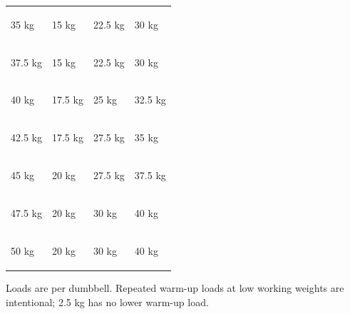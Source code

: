 \documentclass[11pt,a4paper]{article}
\begin{document}
\begin{center}
{\begin{tabular}{|>{\bfseries}C{4.15cm}|C{4.32cm}|C{4.32cm}|C{4.32cm}|}
\rule[-4.2mm]{0pt}{10.65mm}35 kg & 15 kg & 22.5 kg & 30 kg \\
\rule[-4.2mm]{0pt}{10.65mm}37.5 kg & 15 kg & 22.5 kg & 30 kg \\
\rule[-4.2mm]{0pt}{10.65mm}40 kg & 17.5 kg & 25 kg & 32.5 kg \\
\rule[-4.2mm]{0pt}{10.65mm}42.5 kg & 17.5 kg & 27.5 kg & 35 kg \\
\rule[-4.2mm]{0pt}{10.65mm}45 kg & 20 kg & 27.5 kg & 37.5 kg \\
\rule[-4.2mm]{0pt}{10.65mm}47.5 kg & 20 kg & 30 kg & 40 kg \\
\rule[-4.2mm]{0pt}{10.65mm}50 kg & 20 kg & 30 kg & 40 kg \\
\hline
\end{tabular}
}
\end{center}

\vspace{0.24cm}
\begin{center}
\begin{minipage}{17.1cm}
{\fontsize{6.55}{7.9}\selectfont\color{muted}
Loads are per dumbbell. Repeated warm-up loads at low working weights are intentional; 2.5 kg has no lower warm-up load.
}
\end{minipage}
\end{center}
\end{document}
